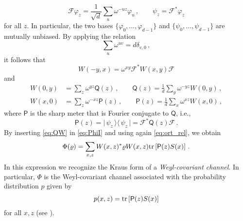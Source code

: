 \documentclass[12pt,reqno]{amsart}
\theoremstyle{definition}
\newcommand{\kb}[2]{\vert\,#1\,\rangle\langle\,#2\,\vert} %
\newcommand{\tr}[1]{{\rm tr}\left[#1\right]} %
\newcommand{\Qo}{\mathsf{Q}}%
\newcommand{\Po}{\mathsf{P}}%
\newcommand{\rhoo}{\varrho} %
\newcommand{\phii}{\varphi} %
\newcommand{\ff}{\mathcal{F}}
\begin{document}
\begin{equation} %
\ff \phii_z = \frac{1}{\sqrt{d}} \sum_u \omega^{-uz} \phii_u\,,\qquad \psi_z = \ff^* \phii_z
\end{equation}
for all $z$. In particular, the two bases $\{\phii_0,\ldots,\phii_{d-1}\}$ and $\{\psi_0,\ldots,\psi_{d-1}\}$ are mutually unbiased. By applying the relation
\begin{equation}\label{eq:ort_rel}
\sum_u \omega^{uv} = d\delta_{v,0}\,,
\end{equation}
it follows that
$$
W(-y,x) = \omega^{xy} \ff^* W(x,y)\ff
$$
and
\begin{equation}\label{eq:QW}
\begin{aligned}
W(0,y) & = \sum_z \omega^{yz} \Qo(z)\,,\qquad \Qo(z) = \frac{1}{d} \sum_y \omega^{-yz} W(0,y)\,, \\
W(x,0) & = \sum_z \omega^{-xz} \Po(z)\,,\qquad \Po(z) = \frac{1}{d} \sum_x \omega^{xz} W(x,0)\,,
\end{aligned}
\end{equation}
where $\Po$ is the sharp meter that is Fourier conjugate to $\Qo$, i.e.,
\begin{equation} %
\Po(z) = \kb{\psi_z}{\psi_z} = \ff^*\Qo(z)\ff\,.
\end{equation}
By inserting \eqref{eq:QW} in \eqref{eq:PhiI} and using again \eqref{eq:ort_rel}, we obtain
\begin{equation} %
\Phi(\rhoo) = \sum_{x,z} W(x,z)^*\rhoo W(x,z) \tr{\Po(z)S(x)}\,.
\end{equation}
In this expression we recognize the Kraus form of a {\em Weyl-covariant channel}. In particular, $\Phi$ is the Weyl-covariant channel associated with the probability distribution $p$ given by
\begin{equation}\label{eq:p}
p(x,z) = \tr{\Po(z)S(x)}
\end{equation}
for all $x,z$ (see \cite{FH05}).
\end{document}
